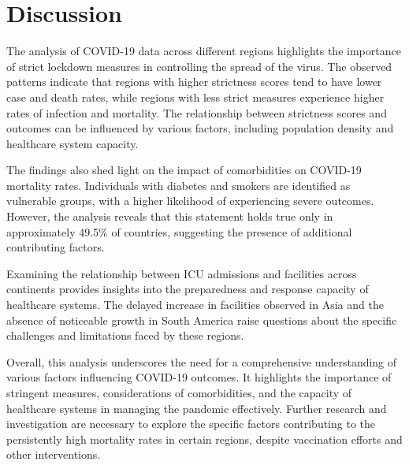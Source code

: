 \documentclass[11pt,preprint, authoryear]{elsarticle}
\numberwithin{equation}{section}
\numberwithin{figure}{section}
\numberwithin{table}{section}
\begin{document}
\hfill

\hypertarget{discussion}{%
\section{Discussion}\label{discussion}}

The analysis of COVID-19 data across different regions highlights the
importance of strict lockdown measures in controlling the spread of the
virus. The observed patterns indicate that regions with higher
strictness scores tend to have lower case and death rates, while regions
with less strict measures experience higher rates of infection and
mortality. The relationship between strictness scores and outcomes can
be influenced by various factors, including population density and
healthcare system capacity.

The findings also shed light on the impact of comorbidities on COVID-19
mortality rates. Individuals with diabetes and smokers are identified as
vulnerable groups, with a higher likelihood of experiencing severe
outcomes. However, the analysis reveals that this statement holds true
only in approximately 49.5\% of countries, suggesting the presence of
additional contributing factors.

Examining the relationship between ICU admissions and facilities across
continents provides insights into the preparedness and response capacity
of healthcare systems. The delayed increase in facilities observed in
Asia and the absence of noticeable growth in South America raise
questions about the specific challenges and limitations faced by these
regions.

Overall, this analysis underscores the need for a comprehensive
understanding of various factors influencing COVID-19 outcomes. It
highlights the importance of stringent measures, considerations of
comorbidities, and the capacity of healthcare systems in managing the
pandemic effectively. Further research and investigation are necessary
to explore the specific factors contributing to the persistently high
mortality rates in certain regions, despite vaccination efforts and
other interventions.


\end{document}
